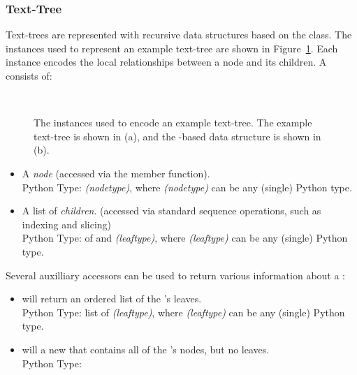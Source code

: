 \documentclass[11pt]{article}
\begin{document}
    \subsubsection{Text-Tree}

      Text-trees are represented with recursive data structures based
      on the  class.  The  instances used to
      represent an example text-tree are shown in
      Figure~\ref{fig:tree-impl}.  Each  instance
      encodes the local relationships between a node and its children.
      A  consists of:

      \begin{figure}
      \begin{centering}
        \\
      \end{centering}

       \caption{The  instances used to encode an example
       text-tree.  The example text-tree is shown in (a), and the
       -based data structure is shown in (b).}
      \label{fig:tree-impl}
      \end{figure}

      \begin{itemize}
    
        \item A \emph{node} (accessed via the 
        member function).  \\
        Python Type: \emph{(nodetype)}, where \emph{(nodetype)} can be
        any (single) Python type.
    
        \item A list of \emph{children}.  (accessed via standard
        sequence operations, such as indexing and slicing) \\
        Python Type:  of  and
        \emph{(leaftype)}, where \emph{(leaftype)} can be any (single)
        Python type.
    
      \end{itemize}

      \noindent Several auxilliary accessors can be used to return
      various information about a :

      \begin{itemize}
    
        \item {} will return an ordered list of the
        's leaves. \\
        Python Type: list of \emph{(leaftype)}, where
        \emph{(leaftype)} can be any (single) Python type.

        \item {} will a new  that contains all
        of the 's nodes, but no leaves. \\
        Python Type: 
    
      \end{itemize}
\end{document}
